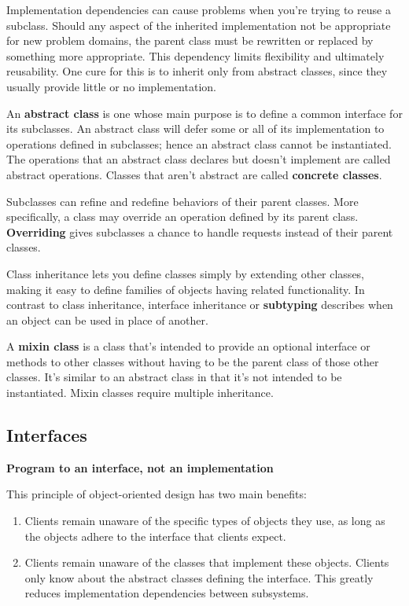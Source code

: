 \documentclass{article}
\begin{document}
Implementation dependencies can cause problems when you're trying to reuse a subclass. Should any aspect of the inherited implementation not be appropriate for new problem domains, the parent class must be rewritten or replaced by something more appropriate. This dependency limits flexibility and ultimately reusability. One cure for this is to inherit only from abstract classes, since they usually provide little or no implementation.

An \textbf{abstract class} is one whose main purpose is to define a common interface for its subclasses. An abstract class will defer some or all of its implementation to operations defined in subclasses; hence an abstract class cannot be instantiated. The operations that an abstract class declares but doesn't implement are called abstract operations. Classes that aren't abstract are called \textbf{concrete classes}.

Subclasses can refine and redefine behaviors of their parent classes. More specifically, a class may override an operation defined by its parent class. \textbf{Overriding} gives subclasses a chance to handle requests instead of their parent classes. 

Class inheritance lets you define classes simply by extending other classes, making it easy to define families of objects having related functionality. In contrast to class inheritance, interface inheritance or \textbf{subtyping} describes when an object can be used in place of another.

A \textbf{mixin class} is a class that's intended to provide an optional interface or methods to other classes without having to be the parent class of those other classes. It's similar to an abstract class in that it's not intended to be instantiated. Mixin classes require multiple inheritance.

\subsection{Interfaces}

\textbf{Program to an interface, not an implementation}

This principle of object-oriented design has two main benefits:
\begin{enumerate}
    \item Clients remain unaware of the specific types of objects they use, as long as the objects adhere to the interface that clients expect.
    \item Clients remain unaware of the classes that implement these objects. Clients only know about the abstract classes defining the interface. This greatly reduces implementation dependencies between subsystems.
\end{enumerate}
\end{document}
